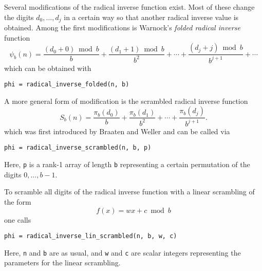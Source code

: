 Several modifications of the radical inverse function exist.  Most of these
change the digits $d_0,\ldots,d_j$ in a certain way so that another radical
inverse value is obtained.  Among the first modifications is Warnock's
\emph{folded radical inverse} function\cite{warnock72}
\[
\psi_b(n) = \frac{(d_0+0) \bmod b}{b} + \frac{(d_1+1) \bmod b}{b^2} + \cdots + \frac{(d_j+j) \bmod b}{b^{j+1}} + \cdots
\]
which can be obtained with
\begin{lstlisting}
phi = radical_inverse_folded(n, b)
\end{lstlisting}
%
A more general form of modification is the scrambled radical inverse function
\[
S_b(n) = \frac{\pi_b(d_0)}{b} + \frac{\pi_b(d_1)}{b^2} + \cdots + \frac{\pi_b(d_j)}{b^{j+1}}.
\]
which was first introduced by Braaten and Weller \cite{braaten79weller} and can
be called via
\begin{lstlisting}
phi = radical_inverse_scrambled(n, b, p)
\end{lstlisting}
Here, \verb!p! is a rank-1 array of length \verb!b! representing a certain
permutation of the digits $0,\ldots,b-1$.

To scramble all digits of the radical inverse function with a linear scrambling
of the form
\[
f(x) = wx+c \bmod{b}
\]
one calls
\begin{lstlisting}
phi = radical_inverse_lin_scrambled(n, b, w, c)
\end{lstlisting}
Here, \verb!n! and \verb!b! are as usual, and \verb!w! and \verb!c! are scalar
integers representing the parameters for the linear scrambling.

